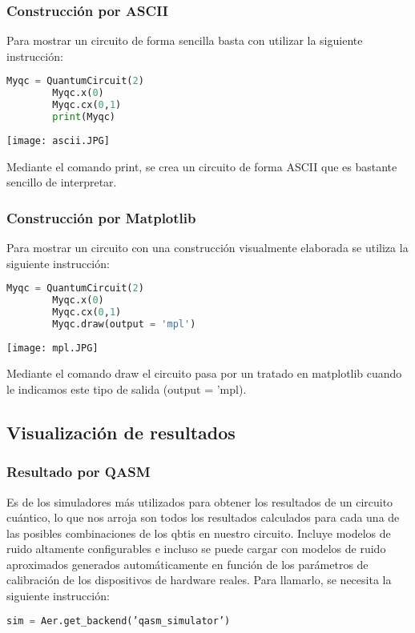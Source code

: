 \documentclass[spanish]{beamer}
\begin{document}
   \newpage\begin{frame}[fragile]
   \frametitle{Construcción por ASCII} 
    Para mostrar un circuito de forma sencilla basta con utilizar la siguiente instrucción:
    
    \begin{lstlisting}[language=Python]
        Myqc = QuantumCircuit(2)
        Myqc.x(0)
        Myqc.cx(0,1)
        print(Myqc) \end{lstlisting} 
        \centering\texttt{[image: ascii.JPG]}
        
        Mediante el comando print, se crea un circuito de forma ASCII que es bastante sencillo de interpretar.
     \end{frame}
    \newpage\begin{frame}[fragile]
   \frametitle{Construcción por Matplotlib} 
    Para mostrar un circuito con una construcción visualmente elaborada se utiliza la siguiente instrucción:
    
     \begin{lstlisting}[language=Python]
        Myqc = QuantumCircuit(2)
        Myqc.x(0)
        Myqc.cx(0,1)
        Myqc.draw(output = 'mpl') \end{lstlisting} 
    \centering\texttt{[image: mpl.JPG]}
    
    Mediante el comando draw el circuito pasa por un tratado en matplotlib cuando le indicamos este tipo de salida (output = 'mpl).
     \end{frame}
   \newpage\subsection{Visualización de resultados}
    \setlength{\parskip}{0.5mm}
   \begin{frame}[fragile]
   \frametitle{Resultado por QASM}
  Es de los simuladores más utilizados para obtener los resultados de un circuito cuántico, lo que nos arroja son todos los resultados calculados para cada una de las posibles combinaciones de los qbtis en nuestro circuito. Incluye modelos de ruido altamente configurables e incluso se puede cargar con modelos de ruido aproximados generados automáticamente en función de los parámetros de calibración de los dispositivos de hardware reales.
   Para llamarlo, se necesita la siguiente instrucción:

    \begin{lstlisting}[language=Python]
    sim = Aer.get_backend(’qasm_simulator’) \end{lstlisting} 
   
   \end{frame}
\end{document}
